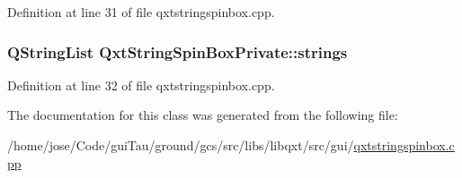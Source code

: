 Definition at line 31 of file qxtstringspinbox.\-cpp.

\hypertarget{class_qxt_string_spin_box_private_ab29c74306012d3c6e9789209c82c1d97}{
\subsubsection[{strings}]{\setlength{\rightskip}{0pt plus 5cm}Q\-String\-List Qxt\-String\-Spin\-Box\-Private\-::strings}}\label{class_qxt_string_spin_box_private_ab29c74306012d3c6e9789209c82c1d97}


Definition at line 32 of file qxtstringspinbox.\-cpp.



The documentation for this class was generated from the following file\-:\begin{DoxyCompactItemize}
\item 
/home/jose/\-Code/gui\-Tau/ground/gcs/src/libs/libqxt/src/gui/\hyperlink{qxtstringspinbox_8cpp}{qxtstringspinbox.\-cpp}\end{DoxyCompactItemize}
